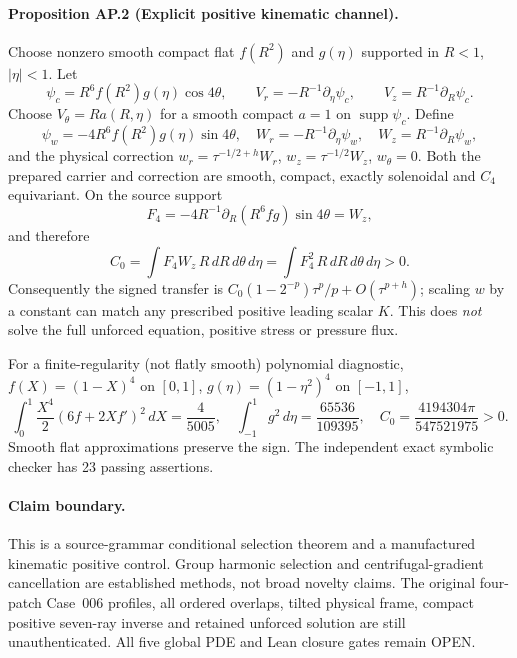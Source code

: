 \paragraph{Proposition AP.2 (Explicit positive kinematic channel).}
Choose nonzero smooth compact flat $f(R^2)$ and $g(\eta)$ supported in $R<1$, $|\eta|<1$. Let
\[
\psi_c=R^6f(R^2)g(\eta)\cos4\theta,\qquad
V_r=-R^{-1}\partial_\eta\psi_c,\qquad
V_z=R^{-1}\partial_R\psi_c.
\]
Choose $V_\theta=Ra(R,\eta)$ for a smooth compact $a=1$ on $\operatorname{supp}\psi_c$. Define
\[
\psi_w=-4R^6f(R^2)g(\eta)\sin4\theta,\quad
W_r=-R^{-1}\partial_\eta\psi_w,\quad
W_z=R^{-1}\partial_R\psi_w,
\]
and the physical correction $w_r=\tau^{-1/2+h}W_r$, $w_z=\tau^{-1/2}W_z$, $w_\theta=0$. Both the prepared carrier and correction are smooth, compact, exactly solenoidal and $C_4$ equivariant. On the source support
\[
F_4=-4R^{-1}\partial_R(R^6fg)\sin4\theta=W_z,
\]
and therefore
\[
\boxed{C_0=\int F_4W_z\,R\,dR\,d\theta\,d\eta
=\int F_4^2\,R\,dR\,d\theta\,d\eta>0.}
\]
Consequently the signed transfer is
$C_0(1-2^{-p})\tau^p/p+O(\tau^{p+h})$; scaling $w$ by a constant can match any prescribed positive leading scalar $K$. This does \emph{not} solve the full unforced equation, positive stress or pressure flux.

For a finite-regularity (not flatly smooth) polynomial diagnostic,
$f(X)=(1-X)^4$ on $[0,1]$, $g(\eta)=(1-\eta^2)^4$ on $[-1,1]$,
\[
\int_0^1\frac{X^4}{2}(6f+2Xf')^2\,dX=\frac4{5005},
\quad\int_{-1}^1g^2\,d\eta=\frac{65536}{109395},
\quad \boxed{C_0=\frac{4194304\pi}{547521975}>0.}
\]
Smooth flat approximations preserve the sign. The independent exact symbolic checker has 23 passing assertions.

\paragraph{Claim boundary.}
This is a source-grammar conditional selection theorem and a manufactured kinematic positive control. Group harmonic selection and centrifugal-gradient cancellation are established methods, not broad novelty claims. The original four-patch Case~006 profiles, all ordered overlaps, tilted physical frame, compact positive seven-ray inverse and retained unforced solution are still unauthenticated. All five global PDE and Lean closure gates remain OPEN.
